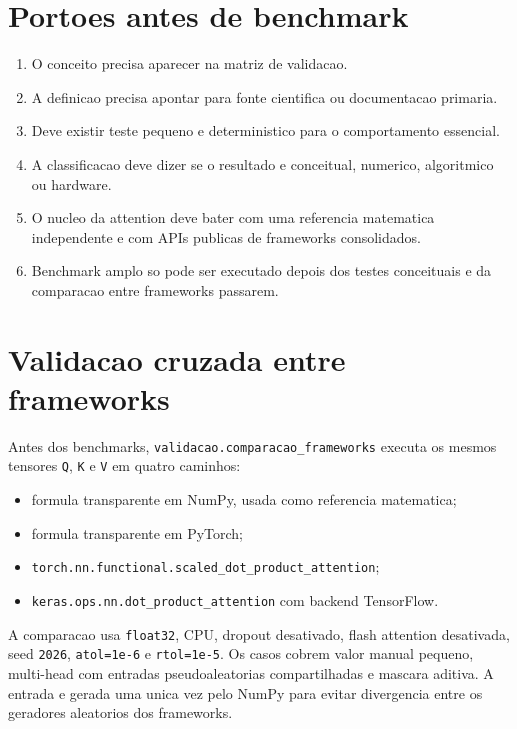 \section{Portoes antes de benchmark}


\begin{enumerate}
\item O conceito precisa aparecer na matriz de validacao.
\item A definicao precisa apontar para fonte cientifica ou documentacao primaria.
\item Deve existir teste pequeno e deterministico para o comportamento essencial.
\item A classificacao deve dizer se o resultado e conceitual, numerico,
algoritmico ou hardware.
\item O nucleo da attention deve bater com uma referencia matematica independente
e com APIs publicas de frameworks consolidados.
\item Benchmark amplo so pode ser executado depois dos testes conceituais e da
comparacao entre frameworks passarem.
\end{enumerate}


\section{Validacao cruzada entre frameworks}




Antes dos benchmarks, \texttt{validacao.\allowbreak{}comparacao\_\allowbreak{}frameworks} executa os mesmos tensores \texttt{Q}, \texttt{K} e \texttt{V} em quatro caminhos:


\begin{itemize}
\item formula transparente em NumPy, usada como referencia matematica;
\item formula transparente em PyTorch;
\item \texttt{torch.\allowbreak{}nn.\allowbreak{}functional.\allowbreak{}scaled\_\allowbreak{}dot\_\allowbreak{}product\_\allowbreak{}attention};
\item \texttt{keras.\allowbreak{}ops.\allowbreak{}nn.\allowbreak{}dot\_\allowbreak{}product\_\allowbreak{}attention} com backend TensorFlow.
\end{itemize}






A comparacao usa \texttt{float32}, CPU, dropout desativado, flash attention desativada, seed \texttt{2026}, \texttt{atol=1e-6} e \texttt{rtol=1e-5}. Os casos cobrem valor manual pequeno, multi-head com entradas pseudoaleatorias compartilhadas e mascara aditiva. A entrada e gerada uma unica vez pelo NumPy para evitar divergencia entre os geradores aleatorios dos frameworks.






